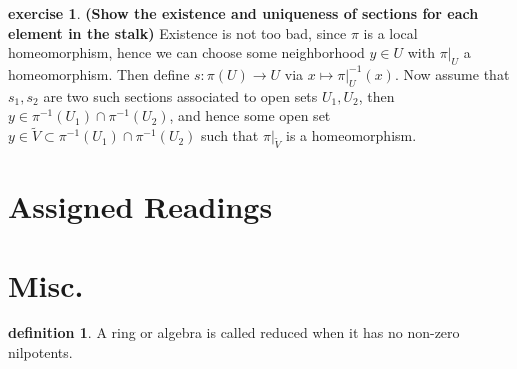 \documentclass[10.5pt]{article}
\theoremstyle{definition}
\newtheorem{exe}{exercise}
\newtheorem{definition}{definition}
\begin{document}
    \begin{exe}\label{Existence and uniqueness sections on stalks}
        \textbf{(Show the existence and uniqueness of sections for each element in the stalk)}
        Existence is not too bad, since \(\pi\) is a local homeomorphism, hence we can choose some neighborhood \(y \in U\) with \(\pi\vert_U\) a homeomorphism. Then define \(s: \pi(U) \to U\) via \(x \mapsto \pi\vert_U^{-1}(x)\). Now assume that \(s_1,s_2\) are two such sections associated to open sets \(U_1,U_2\), then \(y \in \pi^{-1}(U_1) \cap \pi^{-1}(U_2)\), and hence some open set \(y \in \tilde{V} \subset \pi^{-1}(U_1) \cap \pi^{-1}(U_2)\) such that \(\pi\vert_{\tilde{V}}\) is a homeomorphism.
    \end{exe}
    


    \appendix
    
    \section{Assigned Readings}

    \section{Misc.}
    \begin{definition}
        A ring or algebra is called reduced when it has no non-zero nilpotents.
    \end{definition}
\end{document}
